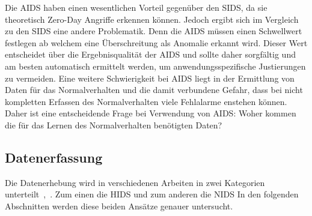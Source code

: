                Die \ac{AIDS} haben einen wesentlichen Vorteil gegenüber den \ac{SIDS}\@, da sie theoretisch Zero-Day Angriffe erkennen können.
                Jedoch ergibt sich im Vergleich zu den \ac{SIDS} eine andere Problematik.
                Denn die \ac{AIDS} müssen einen Schwellwert festlegen ab welchem eine Überschreitung als Anomalie erkannt wird.
                Dieser Wert entscheidet über die Ergebnisqualität der \ac{AIDS}
                und sollte daher sorgfältig und am besten automatisch ermittelt werden,
                um anwendungsspezifische Justierungen zu vermeiden.
                Eine weitere Schwierigkeit bei \ac{AIDS} liegt in der Ermittlung von Daten für das Normalverhalten und die damit verbundene Gefahr,
                dass bei nicht kompletten Erfassen des Normalverhalten viele Fehlalarme enstehen können.
                Daher ist eine entscheidende Frage bei Verwendung von \ac{AIDS}\@: Woher kommen die für das Lernen des Normalverhalten benötigten Daten?

        \subsection{Datenerfassung}\label{sec:Datenerfassung}
            Die Datenerhebung wird in verschiedenen Arbeiten in zwei Kategorien unterteilt~\cite{IDSsurvey},~\cite{IDSreview}.
            Zum einen die \ac{HIDS}
            und zum anderen die \ac{NIDS}
            In den folgenden Abschnitten werden diese beiden Ansätze genauer untersucht.

